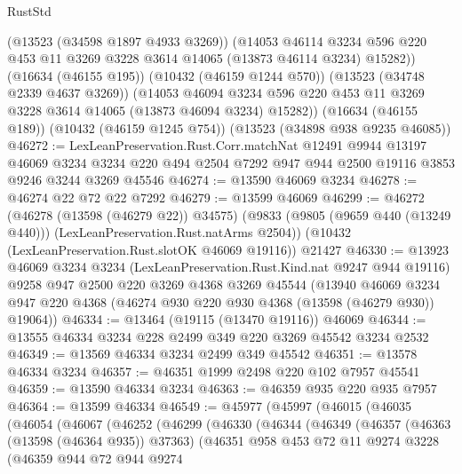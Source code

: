 \begin{lexlean}{RustStd}
\begin{coremodule}
        (@13523 (@34598 @1897 @4933 @3269))
        (@14053
          @46114
          @3234
          @596
          @220
          @453
          @11
          @3269
          @3228
          @3614
          @14065
          (@13873 @46114 @3234)
          @15282))
      (@16634 (@46155 @195))
      (@10432 (@46159 @1244 @570))
      (@13523 (@34748 @2339 @4637 @3269))
      (@14053
        @46094
        @3234
        @596
        @220
        @453
        @11
        @3269
        @3228
        @3614
        @14065
        (@13873 @46094 @3234)
        @15282))
    (@16634 (@46155 @189))
    (@10432 (@46159 @1245 @754))
    (@13523 (@34898 @938 @9235 @46085))
@46272 := LexLeanPreservation.Rust.Corr.matchNat
    @12491
    @9944
    @13197
    @46069
    @3234
    @3234
    @220
    @494
    @2504
    @7292
    @947
    @944
    @2500
    @19116
    @3853
    @9246
    @3244
    @3269
    @45546
@46274 := @13590 @46069 @3234
@46278 := @46274 @22 @72 @22 @7292
@46279 := @13599 @46069
@46299 := @46272
    (@46278 (@13598 (@46279 @22)) @34575)
    (@9833 (@9805 (@9659 @440 (@13249 @440))) (LexLeanPreservation.Rust.natArms @2504))
    (@10432 (LexLeanPreservation.Rust.slotOK @46069 @19116))
    @21427
@46330 := @13923
    @46069
    @3234
    @3234
    (LexLeanPreservation.Rust.Kind.nat @9247 @944 @19116)
    @9258
    @947
    @2500
    @220
    @3269
    @4368
    @3269
    @45544
    (@13940
      @46069
      @3234
      @947
      @220
      @4368
      (@46274 @930 @220 @930 @4368 (@13598 (@46279 @930)) @19064))
@46334 := @13464 (@19115 (@13470 @19116)) @46069
@46344 := @13555 @46334 @3234 @228 @2499 @349 @220 @3269 @45542 @3234 @2532
@46349 := @13569 @46334 @3234 @2499 @349 @45542
@46351 := @13578 @46334 @3234
@46357 := @46351 @1999 @2498 @220 @102 @7957 @45541
@46359 := @13590 @46334 @3234
@46363 := @46359 @935 @220 @935 @7957
@46364 := @13599 @46334
@46549 := @45977
    (@45997
      (@46015
        (@46035
          (@46054
            (@46067
              (@46252
                (@46299
                  (@46330
                    (@46344
                      (@46349
                        (@46357
                          (@46363 (@13598 (@46364 @935)) @37363)
                          (@46351
                            @958
                            @453
                            @72
                            @11
                            @9274
                            @3228
                            (@46359
                              @944
                              @72
                              @944
                              @9274

\end{coremodule}
\end{lexlean}
